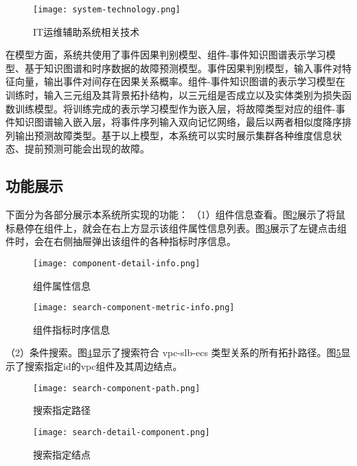 \begin{figure}[htbp]
    \centering
    \texttt{[image: system-technology.png]}
    \caption{IT运维辅助系统相关技术\label{system-technology}}
\end{figure}

在模型方面，系统共使用了事件因果判别模型、组件-事件知识图谱表示学习模型、基于知识图谱和时序数据的故障预测模型。事件因果判别模型，输入事件对特征向量，输出事件对间存在因果关系概率。组件-事件知识图谱的表示学习模型在训练时，输入三元组及其背景拓扑结构，以三元组是否成立以及实体类别为损失函数训练模型。将训练完成的表示学习模型作为嵌入层，将故障类型对应的组件-事件知识图谱输入嵌入层，将事件序列输入双向记忆网络，最后以两者相似度降序排列输出预测故障类型。基于以上模型，本系统可以实时展示集群各种维度信息状态、提前预测可能会出现的故障。

\subsection{功能展示}
下面分为各部分展示本系统所实现的功能：
（1）组件信息查看。图\ref{component-detail-info}展示了将鼠标悬停在组件上，就会在右上方显示该组件属性信息列表。图\ref{search-component-metric-info}展示了左键点击组件时，会在右侧抽屉弹出该组件的各种指标时序信息。
\begin{figure}[htbp]
    \centering
    \texttt{[image: component-detail-info.png]}
    \caption{组件属性信息\label{component-detail-info}}
\end{figure}
\begin{figure}[htbp]
    \centering
    \texttt{[image: search-component-metric-info.png]}
    \caption{组件指标时序信息\label{search-component-metric-info}}
\end{figure}

（2）条件搜索。图\ref{search-component-path}显示了搜索符合 vpc-slb-ecs 类型关系的所有拓扑路径。图\ref{search-detail-component}显示了搜索指定id的vpc组件及其周边结点。

\begin{figure}[htbp]
    \centering
    \texttt{[image: search-component-path.png]}
    \caption{搜索指定路径\label{search-component-path}}
\end{figure}

\begin{figure}[htbp]
    \centering
    \texttt{[image: search-detail-component.png]}
    \caption{搜索指定结点\label{search-detail-component}}
\end{figure}

